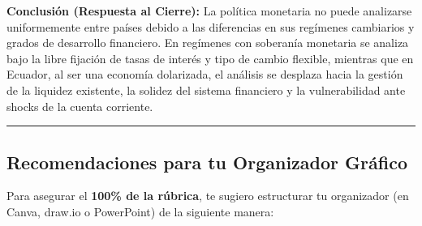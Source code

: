 \documentclass[12pt,spanish]{article}
\begin{document}
\textbf{Conclusión (Respuesta al Cierre):} La política monetaria no
puede analizarse uniformemente entre países debido a las diferencias en
sus regímenes cambiarios y grados de desarrollo financiero. En regímenes
con soberanía monetaria se analiza bajo la libre fijación de tasas de
interés y tipo de cambio flexible, mientras que en Ecuador, al ser una
economía dolarizada, el análisis se desplaza hacia la gestión de la
liquidez existente, la solidez del sistema financiero y la
vulnerabilidad ante shocks de la cuenta corriente.

\begin{center}\rule{0.5\linewidth}{0.5pt}\end{center}

\subsection{Recomendaciones para tu Organizador
Gráfico}\label{recomendaciones-para-tu-organizador-gruxe1fico}

Para asegurar el \textbf{100\% de la rúbrica}, te sugiero estructurar tu
organizador (en Canva, draw.io o PowerPoint) de la siguiente manera:
\end{document}
